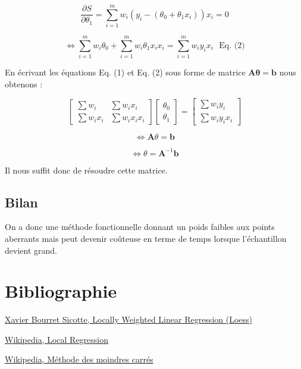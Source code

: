 \documentclass[a4paper,12pt]{article} %
\begin{document}
\[\frac{\partial S}{\partial \theta_1} = \sum_{i=1}^m w_i \left( y_i - (\theta_0 + \theta_1 x_i) \right) x_i  = 0\] 

\[\iff \sum_{i=1}^m w_i  \theta_0 + \sum_{i=1}^m w_i  \theta_1 x_i x_i  = \sum_{i=1}^m w_i y_i  x_i \ \ \ \text{Eq. (2)}\]


En écrivant les équations  Eq. (1) et Eq. (2) sous forme de matrice $\mathbf{A \theta = b}$ nous obtenons :



    \[\begin{bmatrix} \sum w_i & \sum w_i x_i \\ \sum w_i x_i & \sum w_i x_i x_i \end{bmatrix}  \begin{bmatrix} \theta_0 \\ \theta_1 \end{bmatrix}   = \begin{bmatrix}  \sum w_i y_i \\  \sum w_i y_i x_i \end{bmatrix}\] 

    \[\iff \mathbf{A} \theta = \mathbf{b}\]

    \[\iff \theta = \mathbf{A}^{-1} \mathbf{b}\]

Il nous suffit donc de résoudre cette matrice.

\subsection{Bilan}

On a donc une méthode fonctionnelle donnant un poids faibles aux points aberrants mais peut devenir coûteuse en terme de temps lorsque l'échantillon devient grand.


\section{Bibliographie}

\href{https://xavierbourretsicotte.github.io/loess.html}{Xavier Bourret Sicotte, Locally Weighted Linear Regression (Loess)}

\href{https://en.wikipedia.org/wiki/Local_regression}{Wikipedia, Local Regression}

\href{https://fr.wikipedia.org/wiki/Méthode_des_moindres_carrés}{Wikipedia, Méthode des moindres carrés}
     
\end{document}
